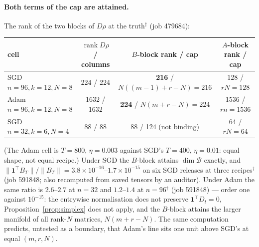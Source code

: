\paragraph{Both terms of the cap are attained.} The rank of the two blocks of
$D\rho$ at the truth$^\dagger$ (job 479684):
\begin{center}\small
\begin{tabular}{@{}lccc@{}}\toprule
cell & $\operatorname{rank}D\rho$ / columns & $B$-block rank / cap & $A$-block rank / cap\\ \midrule
SGD $n{=}96,k{=}12,N{=}8$ & 224 / 224 & \textbf{216} / $N((m{-}1){+}r{-}N)=216$ & 128 / $rN=128$\\
Adam $n{=}96,k{=}12,N{=}8$ & 1632 / 1632 & \textbf{224} / $N(m{+}r{-}N)=224$ & 1536 / $rn=1536$\\
SGD $n{=}32,k{=}6,N{=}4$ & 88 / 88 & 88 / 124 (not binding) & 64 / $rN=64$\\ \bottomrule
\end{tabular}
\end{center}
(The Adam cell is $T=800$, $\eta=0.003$ against SGD's $T=400$, $\eta=0.01$:
equal shape, not equal recipe.) Under SGD the $B$-block attains $\dim\mathcal B$ exactly, and
$\|\mathbf 1^{\!\top}B_T\|/\|B_T\|=3.8\times10^{-16}$--$1.7\times10^{-15}$
on six SGD releases at three recipes$^\dagger$ (job 591848; also recomputed
from saved tensors by an auditor). Under Adam the same ratio is $2.6$--$2.7$
at $n=32$ and $1.2$--$1.4$ at $n=96$$^\dagger$ (job 591848) — order one
against $10^{-15}$: the
entrywise normalisation does not preserve $\mathbf 1^{\!\top}D_t=0$,
Proposition~\ref{prop:simplex} does not apply, and the $B$-block attains the
larger manifold of all rank-$N$ matrices, $N(m+r-N)$. The same computation
predicts, untested as a boundary, that Adam's line sits one unit above SGD's
at equal $(m,r,N)$.

